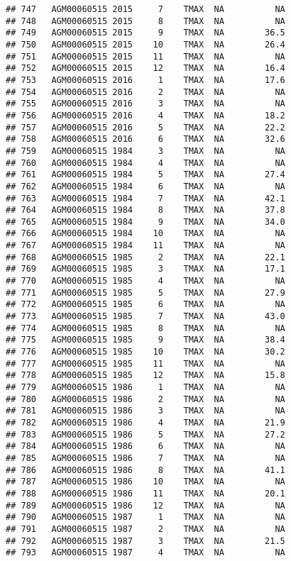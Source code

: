 \documentclass{article}\usepackage[]{graphicx}\usepackage[]{color}
\makeatletter
\newenvironment{kframe}{%
 \def\at@end@of@kframe{}%
 \ifinner\ifhmode%
  \def\at@end@of@kframe{\end{minipage}}%
  \begin{minipage}{\columnwidth}%
 \fi\fi%
 \def\FrameCommand##1{\hskip\@totalleftmargin \hskip-\fboxsep
 \colorbox{shadecolor}{##1}\hskip-\fboxsep
     \hskip-\linewidth \hskip-\@totalleftmargin \hskip\columnwidth}%
 \MakeFramed {\advance\hsize-\width
   \@totalleftmargin\z@ \linewidth\hsize
   \@setminipage}}%
 {\par\unskip\endMakeFramed%
 \at@end@of@kframe}
\newenvironment{knitrout}{}{} %
\makeatother
\begin{document}
\begin{knitrout}
\begin{kframe}
\begin{verbatim}
## 747   AGM00060515 2015     7    TMAX  NA          NA
## 748   AGM00060515 2015     8    TMAX  NA          NA
## 749   AGM00060515 2015     9    TMAX  NA        36.5
## 750   AGM00060515 2015    10    TMAX  NA        26.4
## 751   AGM00060515 2015    11    TMAX  NA          NA
## 752   AGM00060515 2015    12    TMAX  NA        16.4
## 753   AGM00060515 2016     1    TMAX  NA        17.6
## 754   AGM00060515 2016     2    TMAX  NA          NA
## 755   AGM00060515 2016     3    TMAX  NA          NA
## 756   AGM00060515 2016     4    TMAX  NA        18.2
## 757   AGM00060515 2016     5    TMAX  NA        22.2
## 758   AGM00060515 2016     6    TMAX  NA        32.6
## 759   AGM00060515 1984     3    TMAX  NA          NA
## 760   AGM00060515 1984     4    TMAX  NA          NA
## 761   AGM00060515 1984     5    TMAX  NA        27.4
## 762   AGM00060515 1984     6    TMAX  NA          NA
## 763   AGM00060515 1984     7    TMAX  NA        42.1
## 764   AGM00060515 1984     8    TMAX  NA        37.8
## 765   AGM00060515 1984     9    TMAX  NA        34.0
## 766   AGM00060515 1984    10    TMAX  NA          NA
## 767   AGM00060515 1984    11    TMAX  NA          NA
## 768   AGM00060515 1985     2    TMAX  NA        22.1
## 769   AGM00060515 1985     3    TMAX  NA        17.1
## 770   AGM00060515 1985     4    TMAX  NA          NA
## 771   AGM00060515 1985     5    TMAX  NA        27.9
## 772   AGM00060515 1985     6    TMAX  NA          NA
## 773   AGM00060515 1985     7    TMAX  NA        43.0
## 774   AGM00060515 1985     8    TMAX  NA          NA
## 775   AGM00060515 1985     9    TMAX  NA        38.4
## 776   AGM00060515 1985    10    TMAX  NA        30.2
## 777   AGM00060515 1985    11    TMAX  NA          NA
## 778   AGM00060515 1985    12    TMAX  NA        15.8
## 779   AGM00060515 1986     1    TMAX  NA          NA
## 780   AGM00060515 1986     2    TMAX  NA          NA
## 781   AGM00060515 1986     3    TMAX  NA          NA
## 782   AGM00060515 1986     4    TMAX  NA        21.9
## 783   AGM00060515 1986     5    TMAX  NA        27.2
## 784   AGM00060515 1986     6    TMAX  NA          NA
## 785   AGM00060515 1986     7    TMAX  NA          NA
## 786   AGM00060515 1986     8    TMAX  NA        41.1
## 787   AGM00060515 1986    10    TMAX  NA          NA
## 788   AGM00060515 1986    11    TMAX  NA        20.1
## 789   AGM00060515 1986    12    TMAX  NA          NA
## 790   AGM00060515 1987     1    TMAX  NA          NA
## 791   AGM00060515 1987     2    TMAX  NA          NA
## 792   AGM00060515 1987     3    TMAX  NA        21.5
## 793   AGM00060515 1987     4    TMAX  NA          NA

\end{verbatim}
\end{kframe}
\end{knitrout}
\end{document}
